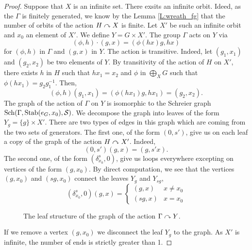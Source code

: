 \begin{lem}
\begin{proof}
Suppose that $X$ is an infinite set. There exsits an infinite orbit. Ideed, as the $\Gamma$ is finitely generated, we know by the Lemma \ref{L:wreath_fg} that the number of orbits of the action $H \curvearrowright X$ is finite. Let $X'$ be such an infinite orbit and $x_0$ an element of $X'$. We define $Y = G \times X'$. The group $\Gamma$ acts on $Y$ via
\begin{equation*}
(\phi,h) \cdot (g,x) = (\phi(hx)g, hx)
\end{equation*}
for $(\phi,h)$ in $\Gamma$ and $(g,x)$ in $Y$. The action is transitive. Indeed, let $(g_1,x_1)$ and $(g_2,x_2)$ be two elements of $Y$. By transitivity of the action of $H$ on $X'$, there exists $h$ in $H$ such that $hx_1 = x_2$ and $\phi$ in $\bigoplus_X G$ such that $\phi(hx_1) = g_2g_1^{-1}$. Then, 
\begin{equation*}
(\phi,h) (g_1,x_1) = (\phi(h x_1) g, h x_1) = (g_2,x_2).
\end{equation*}
The graph of the action of $\Gamma$ on $Y$ is isomorphic to the Schreier graph $\operatorname{Sch}(\Gamma, \operatorname{Stab}(e_G,x_0), \mathcal{S})$. We decompose the graph into leaves of the form $Y_g = \{ g \} \times X'$. There are two types of edges in this graph which are coming from the two sets of generators. The first one, of the form $(0,s')$, give us on each leaf a copy of the graph of the action $H \curvearrowright X'$. Indeed,
\begin{equation*}
(0,s')(g,x) = (g, s'x).
\end{equation*}
The second one, of the form $(\delta_{x_0}^s,0)$, give us loops everywhere excepting on vertices of the form $(g,x_0)$. By direct computation, we see that the vertices $(g,x_0)$ and $(sg,x_0)$ connect the leaves $Y_g$ and $Y_{sg}$, 
\begin{equation*}
(\delta_{x_0}^s,0)(g,x) = 
\begin{cases}
(g,x) & x \neq x_0 \\
(sg, x) & x = x_0
\end{cases}
\end{equation*}
%
\begin{figure}[H]\centering
\scalebox{0.7}{
}
\caption{The leaf structure of the graph of the action $\Gamma \curvearrowright Y$.}
\end{figure}
%
If we remove a vertex $(g,x_0)$ we disconnect the leaf $Y_g$ to the graph. As $X'$ is infinite, the number of ends is strictly greater than 1.


\end{proof}
\end{lem}
